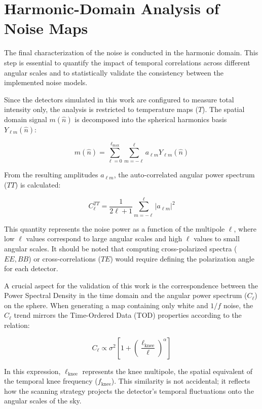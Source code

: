 \section{Harmonic-Domain Analysis of Noise Maps}

The final characterization of the noise is conducted in the harmonic domain. This step is essential to quantify the impact of temporal correlations across different angular scales and to statistically validate the consistency between the implemented noise models.

Since the detectors simulated in this work are configured to measure total intensity only, the analysis is restricted to temperature maps ($T$). The spatial domain signal $m(\hat{n})$ is decomposed into the spherical harmonics basis $Y_{\ell m}(\hat{n})$:

\begin{equation}
m(\hat{n}) = \sum_{\ell=0}^{\ell_{\text{max}}} \sum_{m=-\ell}^{\ell} a_{\ell m} Y_{\ell m}(\hat{n})
\end{equation}

From the resulting amplitudes $a_{\ell m}$, the auto-correlated angular power spectrum ($TT$) is calculated:

\begin{equation}
C_\ell^{TT} = \frac{1}{2\ell+1} \sum_{m=-\ell}^{\ell} |a_{\ell m}|^2
\end{equation}

This quantity represents the noise power as a function of the multipole $\ell$, where low $\ell$ values correspond to large angular scales and high $\ell$ values to small angular scales. It should be noted that computing cross-polarized spectra ($EE, BB$) or cross-correlations ($TE$) would require defining the polarization angle for each detector.

A crucial aspect for the validation of this work is the correspondence between the Power Spectral Density in the time domain and the angular power spectrum ($C_\ell$) on the sphere. When generating a map containing only white and $1/f$ noise, the $C_\ell$ trend mirrors the Time-Ordered Data (TOD) properties according to the relation:

\begin{equation}
C_\ell \propto \sigma^2 \left[ 1 + \left( \frac{\ell_{\text{knee}}}{\ell} \right)^\alpha \right]
\end{equation}

In this expression, $\ell_{\text{knee}}$ represents the knee multipole, the spatial equivalent of the temporal knee frequency ($f_{\text{knee}}$). This similarity is not accidental; it reflects how the scanning strategy projects the detector's temporal fluctuations onto the angular scales of the sky. 

